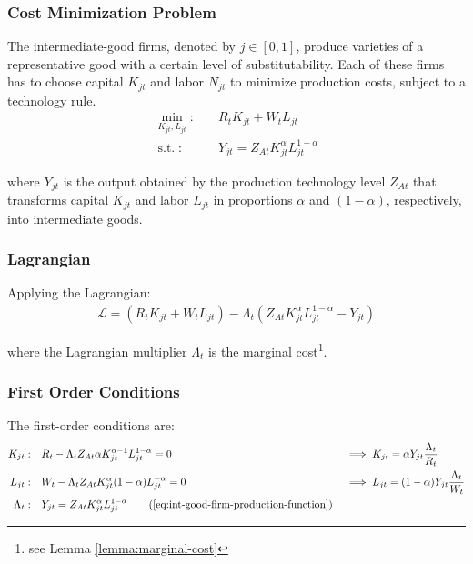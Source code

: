 \documentclass[
	12pt, 
	]{article}
\numberwithin{equation}{section}
\DeclareMathOperator{\st}{s.t.}
\theoremstyle{definition}
\theoremstyle{plain}
\theoremstyle{plain}
\theoremstyle{plain}
\begin{document}
\subsubsection*{Cost Minimization Problem}

The intermediate-good firms, denoted by $j \in [0,1]$, produce varieties of a representative good with a certain level of substitutability. Each of these firms has to choose capital $K_{jt}$ and labor $N_{jt}$ to minimize production costs, subject to a technology rule.
\begin{align}
\label{eq:int-good-firm-total-cost}
	\min_{K_{jt}, L_{jt}}: \quad & R_t K_{jt} + W_t L_{jt} \\
\label{eq:int-good-firm-production-function}
	\st: \quad & Y_{jt} = Z_{At} K_{jt}^\alpha L_{jt}^{1-\alpha}
\end{align}

where $Y_{jt}$ is the output obtained by the production technology level $Z_{At}$\footnotemark{} that transforms capital $K_{jt}$ and labor $L_{jt}$ in proportions $\alpha$ and $(1-\alpha)$, respectively, into intermediate goods.


\subsubsection*{Lagrangian}

Applying the Lagrangian:
\begin{align}
\label{eq:int-good-firm-lagrangian}
	\mathcal{L} = (R_t K_{jt} + W_t L_{jt}) - \Lambda_t (Z_{At} K_{jt}^\alpha L_{jt}^{1-\alpha} - Y_{jt})
\end{align}

where the Lagrangian multiplier $\Lambda_t$ is the marginal cost\footnote{see Lemma \ref{lemma:marginal-cost}}.

\subsubsection*{First Order Conditions}

The first-order conditions are:
\begin{alignat}{2}
	K_{jt}: \quad & R_t - \Lambda_t Z_{At} \alpha K_{jt}^{\alpha-1} L_{jt}^{1-\alpha} = 0 &&\implies K_{jt} = \alpha Y_{jt} \frac{\Lambda_t}{R_t} \label{eq:int-good-firm-FOC-Kt} \\
	L_{jt}: \quad & W_t - \Lambda_t Z_{At} K_{jt}^\alpha (1-\alpha) L_{jt}^{-\alpha} = 0 \quad &&\implies L_{jt} = (1-\alpha) Y_{jt} \frac{\Lambda_t}{W_t} \label{eq:int-good-firm-FOC-Lt} \\
	\Lambda_t: \quad & Y_{jt} = Z_{At} K_{jt}^\alpha L_{jt}^{1-\alpha} \tag{\ref{eq:int-good-firm-production-function}}
\end{alignat}
\end{document}
